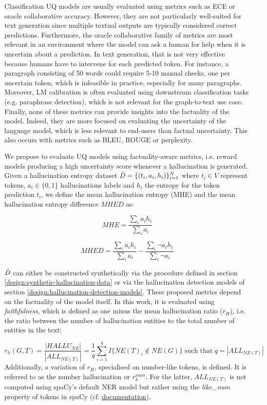 Classification UQ models are usually evaluated using metrics such as ECE or oracle collaborative accuracy. However, they are not particularly well-suited for text generation since multiple textual outputs are typically considered correct predictions. Furthermore, the oracle collaborative family of metrics are most relevant in an environment where the model can ask a human for help when it is uncertain about a prediction. In text generation, that is not very effective because humans have to intervene for each predicted token. For instance, a paragraph consisting of 50 words could require 5-10 manual checks, one per uncertain token, which is infeasible in practice, especially for many paragraphs.
Moreover,  LM calibration is often evaluated using downstream classification tasks (e.g. paraphrase detection), which is not relevant for the graph-to-text use case.
Finally, none of these metrics can provide insights into the factuality of the model. Indeed, they are more focused on evaluating the uncertainty of the language model, which is less relevant to end-users than factual uncertainty. This also occurs with metrics such as BLEU, ROUGE or perplexity.

We propose to evaluate UQ models using factuality-aware metrics, i.e. reward models producing a high uncertainty score whenever a hallucination is generated. Given a hallucination entropy dataset $\Tilde{D} = \{(t_i, a_i, h_i)\}_{i=1}^N$ where $t_i \in V$ represent tokens, $a_i \in \{0,1\}$ hallucinations labels and $h_i$ the entropy for the token prediction $t_i$, we define the mean hallucination entropy (MHE) and the mean hallucination entropy difference $MHED$ as:

$$
MHE = \frac{ \sum_i a_i h_i }{\sum_i a_i}
$$

$$
MHED = \frac{\sum_i a_i h_i}{\sum_i a_i} -   \frac{ \sum_i \neg a_i h_i}{\sum_i \neg a_i}
$$


$\Tilde{D}$ can either be constructed synthetically via the procedure defined in section \ref{design:synthetic-hallucination-data} or via the hallucination detection models of section \ref{design:hallucination-detection-models}. These proposed metrics depend on the factuality of the model itself. In this work, it is evaluated using \textit{faithfulness}, which is defined as one minus the mean hallucination ratio\cite{factualityEnhancedLM} ($r_H$), i.e. the ratio between the number of hallucination entities to the total number of entities in the text:

$$
r_h(G,T) = \frac{ |HALLU_{NE}|}{|ALL_{NE(T)}|} = \frac{1 }{q}  \sum_{i=1}^q I\{NE(T)_i \not \in NE(G) \} \;\text{such that}\; q = |ALL_{NE(T)}|
$$
 Additionally, a variation of $r_H$, specialised on number-like tokens, is defined. It is referred to as the number hallucination or $r_h^{num}$. For the latter, $ALL_{NE(T)}$ is not computed using spaCy's default NER model but rather using the \textit{like\_num} property of tokens in spaCy (cf. \href{https://spacy.io/api/token}{documentation}).